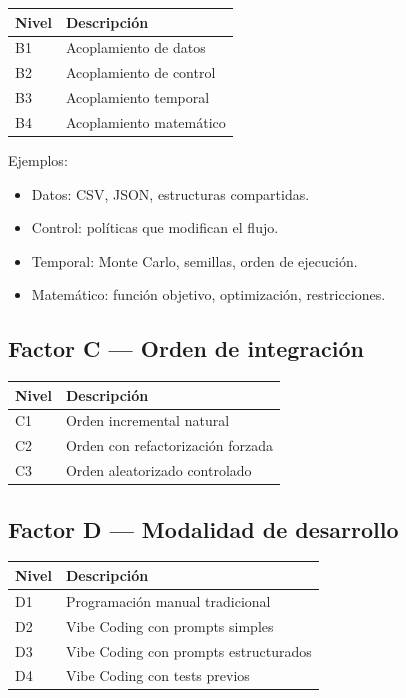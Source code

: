 \documentclass[11pt,a4paper]{article}
\begin{document}
\begin{table}[h!]
\centering
\begin{tabular}{ll}
\toprule
\textbf{Nivel} & \textbf{Descripci\'on} \\
\midrule
B1 & Acoplamiento de datos \\
B2 & Acoplamiento de control \\
B3 & Acoplamiento temporal \\
B4 & Acoplamiento matem\'atico \\
\bottomrule
\end{tabular}
\end{table}

Ejemplos:

\begin{itemize}[leftmargin=*]
    \item Datos: CSV, JSON, estructuras compartidas.
    \item Control: pol\'iticas que modifican el flujo.
    \item Temporal: Monte Carlo, semillas, orden de ejecuci\'on.
    \item Matem\'atico: funci\'on objetivo, optimizaci\'on, restricciones.
\end{itemize}

\subsection{Factor C --- Orden de integraci\'on}

\begin{table}[h!]
\centering
\begin{tabular}{ll}
\toprule
\textbf{Nivel} & \textbf{Descripci\'on} \\
\midrule
C1 & Orden incremental natural \\
C2 & Orden con refactorizaci\'on forzada \\
C3 & Orden aleatorizado controlado \\
\bottomrule
\end{tabular}
\end{table}

\subsection{Factor D --- Modalidad de desarrollo}

\begin{table}[h!]
\centering
\begin{tabular}{ll}
\toprule
\textbf{Nivel} & \textbf{Descripci\'on} \\
\midrule
D1 & Programaci\'on manual tradicional \\
D2 & Vibe Coding con prompts simples \\
D3 & Vibe Coding con prompts estructurados \\
D4 & Vibe Coding con tests previos \\
\bottomrule
\end{tabular}
\end{table}
\end{document}
